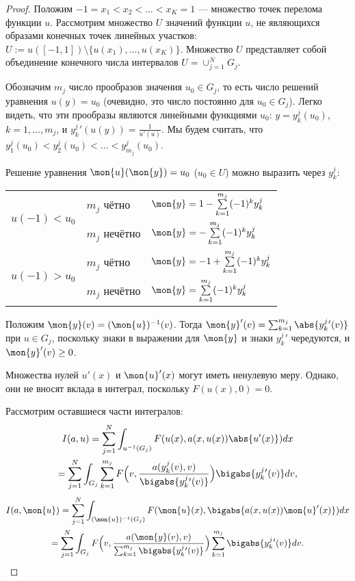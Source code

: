 \begin{proof}
Положим $-1 = x_1 < x_2 < \dots < x_K = 1$ --- множество точек перелома функции $u$.
Рассмотрим множество $U$ значений функции $u$, не являющихся образами конечных точек
линейных участков: $U := u( [-1, 1] ) \setminus \{ u(x_1), \dots, u(x_K) \}$.
Множество $U$ представляет собой объединение конечного числа интервалов $U = \cup_{j = 1}^N G_j$.

Обозначим $m_j$ число прообразов значения $u_0 \in G_j$,
то есть число решений уравнения $u(y) = u_0$ 
(очевидно, это число постоянно для $u_0 \in G_j$).
Легко видеть, что эти прообразы являются линейными функциями $u_0$:
$y = y_k^j(u_0)$, $k = 1, \dots, m_j$,
и $y_k^j{}'(u(y)) = \frac{1}{u'(u)}$.
Мы будем считать, что $y_1^j(u_0) < y_2^j(u_0) < \dots < y_{m_j}^j(u_0)$.

Решение уравнения $\mon{u}(\mon{y})=u_0$ ($u_0 \in U$) можно выразить через $y_k^j$:

\begin{center}
\begin{tabular}{l|l|l} 
\multirow{2}{*}{$u(-1)<u_0$ \rule[-34pt]{0pt}{65pt}} & $m_j$ чётно   & $\mon{y}=1-\sum\limits_{k=1}^{m_j} (-1)^k y_k^j$ \rule[-17pt]{0pt}{40pt} \\
                                                     & $m_j$ нечётно & $\mon{y}=-\sum\limits_{k=1}^{m_j} (-1)^k y_k^j$ \rule[-17pt]{0pt}{40pt} \\ \hline
\multirow{2}{*}{$u(-1)>u_0$ \rule[-34pt]{0pt}{65pt}} & $m_j$ чётно   & $\mon{y}=-1+\sum\limits_{k=1}^{m_j} (-1)^k y_k^j$ \rule[-17pt]{0pt}{40pt} \\
                                                     & $m_j$ нечётно & $\mon{y}=\sum\limits_{k=1}^{m_j} (-1)^k y_k^j$ \rule[-17pt]{0pt}{40pt} \\
\end{tabular}
\end{center}

Положим $\mon{y}(v) = (\mon{u})^{-1}(v)$.
Тогда $\mon{y}'(v) = \sum_{k=1}^{m_j} \abs{y_k^j{}'(v)}$ при $u \in G_j$, поскольку знаки в выражении для
$\mon{y}$ и знаки $y_k^j{}'$ чередуются, и $\mon{y}'(v)\ge 0$.

Множества нулей $u'(x)$ и $\mon{u}'(x)$ могут иметь ненулевую меру.
Однако, они не вносят вклада в интеграл, поскольку $F(u(x), 0) = 0$.

Рассмотрим оставшиеся части интегралов:
\begin{multline*}
I(a, u) = \sum_{j=1}^N \int_{u^{-1}(G_j)} F(u(x), a(x, u(x)) \abs{u'(x)}) dx
\\ = \sum_{j=1}^N \int_{G_j} \sum_{k=1}^{m_j} F \Bigl( v, \frac{a(y_k^j(v), v)}{\bigabs{y_k^j{}'(v)}} \Bigr) \bigabs{y_k^j{}'(v)} dv,
\end{multline*}
\begin{multline*}
I(a, \mon{u}) = \sum_{j=1}^N \int_{(\mon{u})^{-1}(G_j)} F(\mon{u}(x), \bigabs{a(x, u(x)) \mon{u}'(x)}) dx
\\ = \sum_{j=1}^N \int_{G_j} F \Bigl( v, \frac{a(\mon{y}(v), v)}{\sum_{k=1}^{m_j} \bigabs{y_k^j{}'(v)}} \Bigr)
\sum_{k=1}^{m_j} \bigabs{ y_k^j{}'(v) } dv.
\end{multline*}


\end{proof}
